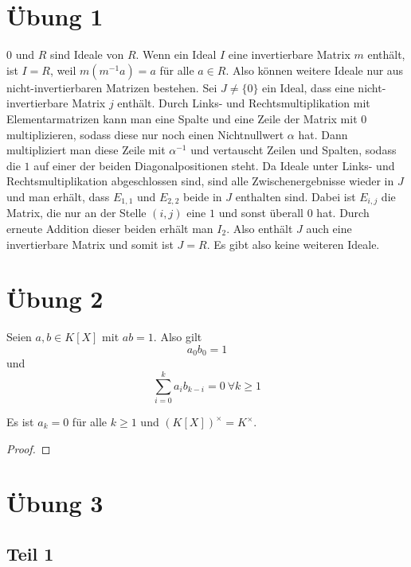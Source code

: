 \documentclass[10pt,a4paper]{article}
\begin{document}
\section{Übung 1}

$0$ und $R$ sind Ideale von $R$.
Wenn ein Ideal $I$ eine invertierbare Matrix $m$ enthält, ist $I = R$, weil $m(m^{-1}a) = a$ für alle $a \in R$.
Also können weitere Ideale nur aus nicht-invertierbaren Matrizen bestehen.
Sei $J \ne \{ 0 \}$ ein Ideal, dass eine nicht-invertierbare Matrix $j$ enthält.
Durch Links- und Rechtsmultiplikation mit Elementarmatrizen kann man eine Spalte und eine Zeile der Matrix mit $0$ multiplizieren, sodass diese nur noch einen Nichtnullwert $\alpha$ hat.
Dann multipliziert man diese Zeile mit $\alpha^{-1}$ und vertauscht Zeilen und Spalten, sodass die $1$ auf einer der beiden Diagonalpositionen steht.
Da Ideale unter Links- und Rechtsmultiplikation abgeschlossen sind, sind alle Zwischenergebnisse wieder in $J$ und man erhält, dass $E_{1,1}$ und $E_{2,2}$ beide in $J$ enthalten sind.
Dabei ist $E_{i,j}$ die Matrix, die nur an der Stelle $(i, j)$ eine $1$ und sonst überall $0$ hat.
Durch erneute Addition dieser beiden erhält man $I_{2}$.
Also enthält $J$ auch eine invertierbare Matrix und somit ist $J = R$.
Es gibt also keine weiteren Ideale.

\section{Übung 2}

Seien $a, b \in K[X]$ mit $ab = 1$.
Also gilt
\begin{equation}
  a_{0}b_{0} = 1
\end{equation}
und
\begin{equation}
  \sum_{i = 0}^{k} a_{i}b_{k - i} = 0\ \forall k \ge 1
\end{equation}

Es ist $a_{k} = 0$ für alle $k \ge 1$ und $(K[X])^{\times} = K^{\times}$.

\begin{proof}
\end{proof}

\section{Übung 3}

\subsection{Teil 1}
\end{document}
